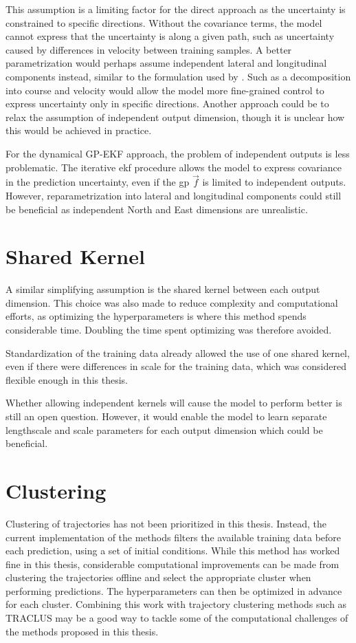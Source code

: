 This assumption is a limiting factor for the direct approach as the uncertainty is constrained to specific directions. Without the covariance terms, the model cannot express that the uncertainty is along a given path, such as uncertainty caused by differences in velocity between training samples. A better parametrization would perhaps assume independent lateral and longitudinal components instead, similar to the formulation used by \cite{gp_ais_trajectory}. Such as a decomposition into course and velocity would allow the model more fine-grained control to express uncertainty only in specific directions. Another approach could be to relax the assumption of independent output dimension, though it is unclear how this would be achieved in practice. 

For the dynamical GP-EKF approach, the problem of independent outputs is less problematic. The iterative \acrshort{ekf} procedure allows the model to express covariance in the prediction uncertainty, even if the \acrshort{gp} $\vec{f}$ is limited to independent outputs. However, reparametrization into lateral and longitudinal components could still be beneficial as independent North and East dimensions are unrealistic.  

\section{Shared Kernel}
A similar simplifying assumption is the shared kernel between each output dimension. This choice was also made to reduce complexity and computational efforts, as optimizing the hyperparameters is where this method spends considerable time. Doubling the time spent optimizing was therefore avoided. 

Standardization of the training data already allowed the use of one shared kernel, even if there were differences in scale for the training data, which was considered flexible enough in this thesis.

Whether allowing independent kernels will cause the model to perform better is still an open question. However, it would enable the model to learn separate lengthscale and scale parameters for each output dimension which could be beneficial. 

\section{Clustering}
Clustering of trajectories has not been prioritized in this thesis. Instead, the current implementation of the methods filters the available training data before each prediction, using a set of initial conditions. While this method has worked fine in this thesis, considerable computational improvements can be made from clustering the trajectories offline and select the appropriate cluster when performing predictions. The hyperparameters can then be optimized in advance for each cluster. Combining this work with trajectory clustering methods such as TRACLUS \cite{traclus} may be a good way to tackle some of the computational challenges of the methods proposed in this thesis.

